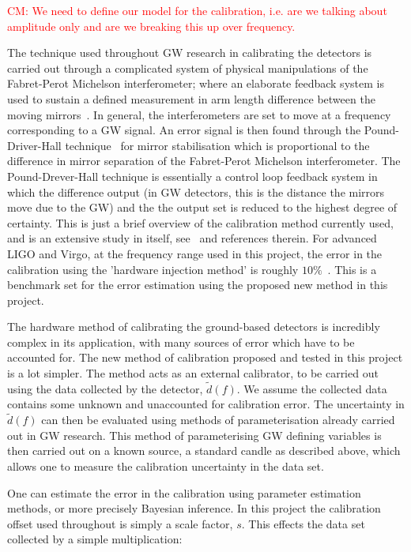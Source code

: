 \documentclass[12pt]{iopart}
\newcommand{\cm}[1]{\textcolor{red}{CM: #1}}
\begin{document}
\cm{We need to define our model for the calibration, i.e. are we talking
about amplitude only and are we breaking this up over frequency.}

The technique used throughout GW research in calibrating the detectors is
carried out through a complicated system of physical manipulations of the
Fabret-Perot Michelson interferometer; where an elaborate feedback system is
used to sustain a defined measurement in arm length difference between the
moving mirrors~\cite{LIGOCal}. In general, the interferometers are set to move
at a frequency corresponding to a GW signal. An error signal is then found
through the Pound-Driver-Hall technique~\cite{Black} for mirror stabilisation
which is proportional to the difference in mirror separation of the
Fabret-Perot Michelson interferometer. The Pound-Drever-Hall technique is
essentially a control loop feedback system in which the difference output (in
GW detectors, this is the distance the mirrors move due to the GW) and the the
output set is reduced to the highest degree of certainty. This is just a brief
overview of the calibration method currently used, and is an extensive study in
itself, see~\cite{Vitale} and references therein. For advanced LIGO and Virgo,
at the frequency range used in this project, the error in the calibration using
the 'hardware injection method' is roughly $10\%$~\cite{Vitale}. This is a
benchmark set for the error estimation using the proposed new method in this
project.

The hardware method of calibrating the ground-based detectors is incredibly
complex in its application, with many sources of error which have to be
accounted for. The new method of calibration proposed and tested in this
project is a lot simpler. The method acts as an external calibrator, to be
carried out using the data collected by the detector, $\tilde{d}(f)$. We assume
the collected data contains some unknown and unaccounted for calibration error.
The uncertainty in $\tilde{d}(f)$ can then be evaluated using methods of
parameterisation already carried out in GW research. This method of
parameterising GW defining variables is then carried out on a known source, a
standard candle as described above, which allows one to measure the calibration
uncertainty in the data set.

One can estimate the error in the calibration using parameter estimation
methods, or more precisely Bayesian inference. In this project the calibration
offset used throughout is simply a scale factor, $s$. This effects the data set
collected by a simple multiplication:
\end{document}
